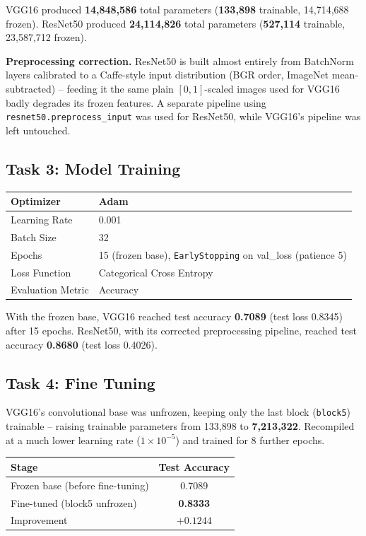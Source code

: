 \documentclass[11pt]{article}
\begin{document}
VGG16 produced \textbf{14,848,586} total parameters (\textbf{133,898}
trainable, 14,714,688 frozen). ResNet50 produced \textbf{24,114,826}
total parameters (\textbf{527,114} trainable, 23,587,712 frozen).

\textbf{Preprocessing correction.} ResNet50 is built almost entirely
from BatchNorm layers calibrated to a Caffe-style input distribution
(BGR order, ImageNet mean-subtracted) -- feeding it the same plain
$[0,1]$-scaled images used for VGG16 badly degrades its frozen
features. A separate pipeline using \texttt{resnet50.preprocess\_input}
was used for ResNet50, while VGG16's pipeline was left untouched.

\subsection*{Task 3: Model Training}

\begin{center}
\begin{tabular}{|p{5cm}|p{6cm}|}
\hline
Optimizer & Adam\\
\hline
Learning Rate & 0.001\\
\hline
Batch Size & 32\\
\hline
Epochs & 15 (frozen base), \texttt{EarlyStopping} on val\_loss (patience 5)\\
\hline
Loss Function & Categorical Cross Entropy\\
\hline
Evaluation Metric & Accuracy\\
\hline
\end{tabular}
\end{center}

With the frozen base, VGG16 reached test accuracy \textbf{0.7089}
(test loss 0.8345) after 15 epochs. ResNet50, with its corrected
preprocessing pipeline, reached test accuracy \textbf{0.8680} (test
loss 0.4026).

\subsection*{Task 4: Fine Tuning}

VGG16's convolutional base was unfrozen, keeping only the last
block (\texttt{block5}) trainable -- raising trainable parameters
from 133,898 to \textbf{7,213,322}. Recompiled at a much lower
learning rate ($1\times10^{-5}$) and trained for 8 further epochs.

\begin{center}
\begin{tabular}{|l|c|}
\hline
Stage & Test Accuracy\\
\hline
Frozen base (before fine-tuning) & 0.7089\\
\hline
Fine-tuned (block5 unfrozen) & \textbf{0.8333}\\
\hline
Improvement & $+0.1244$\\
\hline
\end{tabular}
\end{center}
\end{document}
